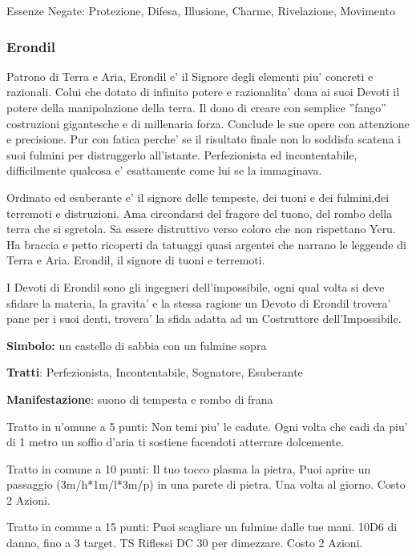 \documentclass[a4paper,11pt,twoside,openany]{book}
\begin{document}
{		Essenze Negate: Protezione, Difesa, Illusione, Charme, Rivelazione, Movimento
		
		\subsubsection{Erondil}
		
		\label{erondil}
		
		Patrono di Terra e Aria, Erondil e' il Signore degli elementi piu' concreti e razionali. Colui che dotato di infinito potere e razionalita' dona ai suoi Devoti il potere della manipolazione della terra. Il dono di creare con semplice ''fango'' costruzioni gigantesche e di millenaria forza. Conclude le sue opere con attenzione e precisione. Pur con fatica perche' se il risultato finale non lo soddisfa scatena i suoi fulmini per distruggerlo all'istante. Perfezionista ed incontentabile, difficilmente qualcosa e' esattamente come lui se la immaginava. 
		
		Ordinato ed esuberante e' il signore delle tempeste, dei tuoni e dei fulmini,dei terremoti e distruzioni. Ama circondarsi del fragore del tuono, del rombo della terra che si sgretola. Sa essere distruttivo verso coloro che non rispettano Yeru.
		Ha braccia e petto ricoperti da tatuaggi quasi argentei che narrano le leggende di Terra e Aria. Erondil, il signore di tuoni e terremoti.
		
		
		I Devoti di Erondil sono gli ingegneri dell'impossibile, ogni qual volta si deve sfidare la materia, la gravita' e la stessa ragione un Devoto di Erondil trovera' pane per i suoi denti, trovera' la sfida adatta ad un Costruttore dell'Impossibile.
		
		\textbf{Simbolo:} un castello di sabbia con un fulmine sopra
		
		\textbf{Tratti}: Perfezionista, Incontentabile, Sognatore, Esuberante
		
		\textbf{Manifestazione}: suono di tempesta e rombo di frana
		
		\bigskip
		
		Tratto in u'omune a 5 punti: Non temi piu' le cadute. Ogni volta che cadi da piu' di 1 metro un soffio d'aria ti sostiene facendoti atterrare dolcemente.
		
		Tratto in comune a 10 punti: Il tuo tocco plasma la pietra, Puoi aprire un passaggio (3m/h{*}1m/l{*}3m/p) in una parete di pietra. Una volta al giorno. Costo 2 Azioni.
		
		Tratto in comune a 15 punti: Puoi scagliare un fulmine dalle tue mani. 10D6 di danno, fino a 3 target. TS Riflessi DC 30 per dimezzare. Costo 2 Azioni.
		
}
\end{document}
